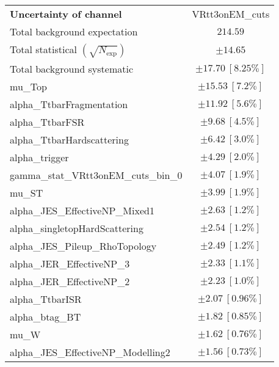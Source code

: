 
\begin{table}
\begin{center}
\setlength{\tabcolsep}{0.0pc}
\begin{tabular*}{\textwidth}{@{\extracolsep{\fill}}lc}
\noalign{\smallskip}\hline\noalign{\smallskip}
{\textbf{Uncertainty of channel}}                                    & VRtt3onEM\_cuts            \\
\noalign{\smallskip}\hline\noalign{\smallskip}
Total background expectation             &  $214.59$       \\
\noalign{\smallskip}\hline\noalign{\smallskip}
Total statistical $(\sqrt{N_{\mathrm{exp}}})$              & $\pm 14.65$       \\
Total background systematic               & $\pm 17.70\ [8.25\%] $             \\
\noalign{\smallskip}\hline\noalign{\smallskip}
\noalign{\smallskip}\hline\noalign{\smallskip}
mu\_Top         & $\pm 15.53\ [7.2\%] $       \\
alpha\_TtbarFragmentation         & $\pm 11.92\ [5.6\%] $       \\
alpha\_TtbarFSR         & $\pm 9.68\ [4.5\%] $       \\
alpha\_TtbarHardscattering         & $\pm 6.42\ [3.0\%] $       \\
alpha\_trigger         & $\pm 4.29\ [2.0\%] $       \\
gamma\_stat\_VRtt3onEM\_cuts\_bin\_0         & $\pm 4.07\ [1.9\%] $       \\
mu\_ST         & $\pm 3.99\ [1.9\%] $       \\
alpha\_JES\_EffectiveNP\_Mixed1         & $\pm 2.63\ [1.2\%] $       \\
alpha\_singletopHardScattering         & $\pm 2.54\ [1.2\%] $       \\
alpha\_JES\_Pileup\_RhoTopology         & $\pm 2.49\ [1.2\%] $       \\
alpha\_JER\_EffectiveNP\_3         & $\pm 2.33\ [1.1\%] $       \\
alpha\_JER\_EffectiveNP\_2         & $\pm 2.23\ [1.0\%] $       \\
alpha\_TtbarISR         & $\pm 2.07\ [0.96\%] $       \\
alpha\_btag\_BT         & $\pm 1.82\ [0.85\%] $       \\
mu\_W         & $\pm 1.62\ [0.76\%] $       \\
alpha\_JES\_EffectiveNP\_Modelling2         & $\pm 1.56\ [0.73\%] $       \\

\end{tabular*}
\end{center}
\end{table}
